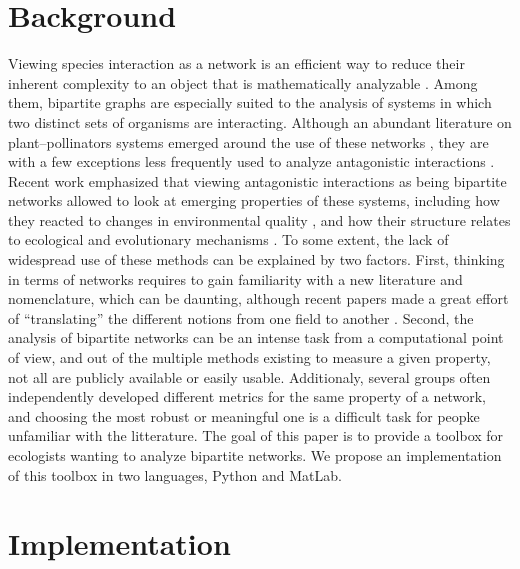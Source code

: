 \documentclass[10pt]{bmc_article}
\newenvironment{bmcformat}{\fussy\setboolean{publ}{true}}{\fussy}
\begin{document}
\begin{bmcformat}


\section*{Background}

Viewing species interaction as a network is an efficient way to reduce their
inherent complexity to an object that is mathematically analyzable
\cite{Proulx2005,Dunne2006}. Among them, bipartite graphs \cite{Chartrand1985}
are especially suited to the analysis of systems in which two distinct sets of
organisms are interacting. Although an abundant literature on plant--pollinators
systems emerged around the use of these networks
\cite{Bascompte2007,Stouffer2011,Bascompte2003,Bastolla2009,Joppa2009}, they
are with a few exceptions \cite{Thebault2008,Thebault2010} less frequently
used to analyze antagonistic interactions \cite{Poulin2010}. Recent work
emphasized that viewing antagonistic interactions as being bipartite networks
allowed to look at emerging properties of these systems, including how they
reacted to changes in environmental quality
\cite{PoisotBL2011,PoisotPRSLB2011}, and how their structure relates to
ecological and evolutionary mechanisms \cite{Flores2011}. To some extent, the
lack of widespread use of these methods can be explained by two factors.
First, thinking in terms of networks requires to gain familiarity with a new
literature and nomenclature, which can be daunting, although recent papers
made a great effort of ``translating'' the different notions from one field to
another \cite{Poulin2010}. Second, the analysis of bipartite networks can be
an intense task from a computational point of view, and out of the multiple
methods existing to measure a given property, not all are publicly available
or easily usable. Additionaly, several groups often independently developed
different metrics for the same property of a network, and choosing the most
robust or meaningful one is a difficult task for peopke unfamiliar with the
litterature. The goal of this paper is to provide a toolbox for ecologists
wanting to analyze bipartite networks. We propose an implementation of this
toolbox in two languages, Python and MatLab.

\section*{Implementation}


\end{bmcformat}
\end{document}
